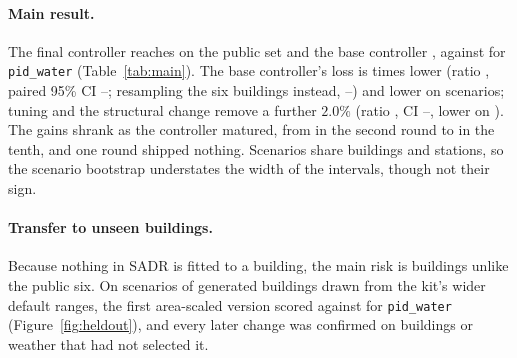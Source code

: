 

\paragraph{Main result.} The final controller reaches \FinPub{} on the public set and the base controller \RTenConfPubCand, against \MetricPidWater{} for \texttt{pid\_water} (Table~\ref{tab:main}). The base controller's loss is \RElvPwTimes{} times lower (ratio \RElvPwRatio, paired 95\% CI \RElvPwRatioLo--\RElvPwRatioHi; resampling the six buildings instead, \RElvPwRatioCLo--\RElvPwRatioCHi) and lower on \RElvPwWins{} scenarios; tuning and the structural change remove a further \(2.0\%\) (ratio \FinPubRatio, CI \FinPubRatioLo--\FinPubRatioHi, lower on \FinPubWins). The gains shrank as the controller matured, from \CandWinnerRelRed{} in the second round to \RTenConfPubRelAbs{} in the tenth, and one round shipped nothing. Scenarios share buildings and stations, so the scenario bootstrap understates the width of the intervals, though not their sign.

\paragraph{Transfer to unseen buildings.} Because nothing in SADR is fitted to a building, the main risk is buildings unlike the public six. On \NHeldAll{} scenarios of \NHeldAllBuild{} generated buildings drawn from the kit's wider default ranges, the first area-scaled version scored \HeldAllMetricOurs{} against \HeldAllMetricPidWater{} for \texttt{pid\_water} (Figure~\ref{fig:heldout}), and every later change was confirmed on buildings or weather that had not selected it.

